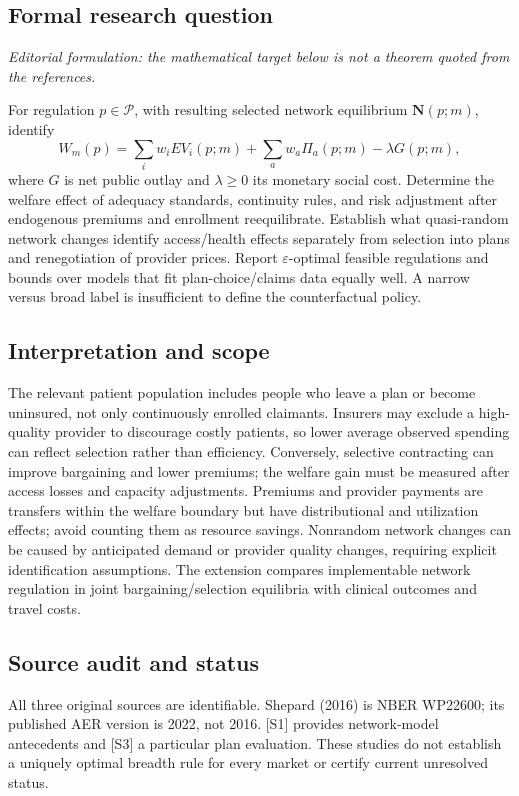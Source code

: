 \documentclass[11pt,a4paper]{article}
\begin{document}
\subsection*{Formal research question}
\emph{Editorial formulation: the mathematical target below is not a theorem quoted from the references.}

For regulation $p\in\mathcal P$, with resulting selected network equilibrium $\mathbf N(p;m)$, identify
\[
 W_m(p)=\sum_iw_iEV_i(p;m)+\sum_aw_a\Pi_a(p;m)-\lambda G(p;m),
\]
where $G$ is net public outlay and $\lambda\geq0$ its monetary social cost. Determine the welfare effect of adequacy standards, continuity rules, and risk adjustment after endogenous premiums and enrollment reequilibrate. Establish what quasi-random network changes identify access/health effects separately from selection into plans and renegotiation of provider prices. Report $\varepsilon$-optimal feasible regulations and bounds over models that fit plan-choice/claims data equally well. A narrow versus broad label is insufficient to define the counterfactual policy.

\subsection*{Interpretation and scope}
The relevant patient population includes people who leave a plan or become uninsured, not only continuously enrolled claimants. Insurers may exclude a high-quality provider to discourage costly patients, so lower average observed spending can reflect selection rather than efficiency. Conversely, selective contracting can improve bargaining and lower premiums; the welfare gain must be measured after access losses and capacity adjustments. Premiums and provider payments are transfers within the welfare boundary but have distributional and utilization effects; avoid counting them as resource savings. Nonrandom network changes can be caused by anticipated demand or provider quality changes, requiring explicit identification assumptions. The extension compares implementable network regulation in joint bargaining/selection equilibria with clinical outcomes and travel costs.

\subsection*{Source audit and status}
All three original sources are identifiable. Shepard (2016) is NBER WP22600; its published AER version is 2022, not 2016. [S1] provides network-model antecedents and [S3] a particular plan evaluation. These studies do not establish a uniquely optimal breadth rule for every market or certify current unresolved status.
\end{document}
